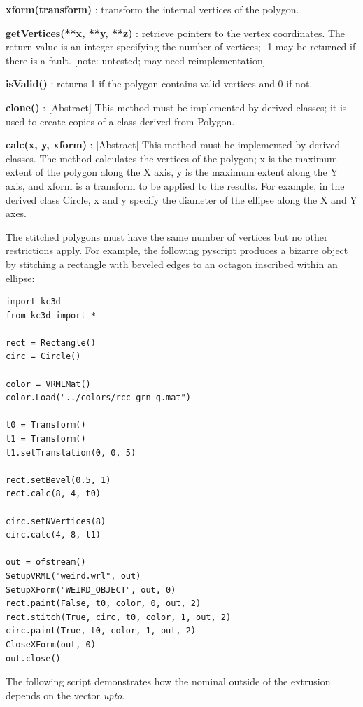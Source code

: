 \textbf{xform(transform)} : transform the internal vertices of the polygon.

\textbf{getVertices(**x, **y, **z)} : retrieve pointers to the vertex coordinates.
The return value is an integer specifying the number of vertices; -1 may be returned
if there is a fault. [note: untested; may need reimplementation]

\textbf{isValid()} : returns 1 if the polygon contains valid vertices and 0 if not.

\textbf{clone()} : [Abstract] This method must be implemented by derived classes;
it is used to create copies of a class derived from Polygon.

\textbf{calc(x, y, xform)} : [Abstract] This method must be implemented by derived
classes. The method calculates the vertices of the polygon; x is the
maximum extent of the polygon along the X axis, y is the maximum extent
along the Y axis, and xform is a transform to be applied to the results.
For example, in the derived class Circle, x and y specify the diameter
of the ellipse along the X and Y axes.

The stitched polygons must have the same number of vertices but no other restrictions
apply.  For example, the following pyscript produces a bizarre object by stitching a
rectangle with beveled edges to an octagon inscribed within an ellipse:

\begin{verbatim}
import kc3d
from kc3d import *

rect = Rectangle()
circ = Circle()

color = VRMLMat()
color.Load("../colors/rcc_grn_g.mat")

t0 = Transform()
t1 = Transform()
t1.setTranslation(0, 0, 5)

rect.setBevel(0.5, 1)
rect.calc(8, 4, t0)

circ.setNVertices(8)
circ.calc(4, 8, t1)

out = ofstream()
SetupVRML("weird.wrl", out)
SetupXForm("WEIRD_OBJECT", out, 0)
rect.paint(False, t0, color, 0, out, 2)
rect.stitch(True, circ, t0, color, 1, out, 2)
circ.paint(True, t0, color, 1, out, 2)
CloseXForm(out, 0)
out.close()
\end{verbatim}

The following script demonstrates how the nominal outside of the
extrusion depends on the vector \emph{upto}.

